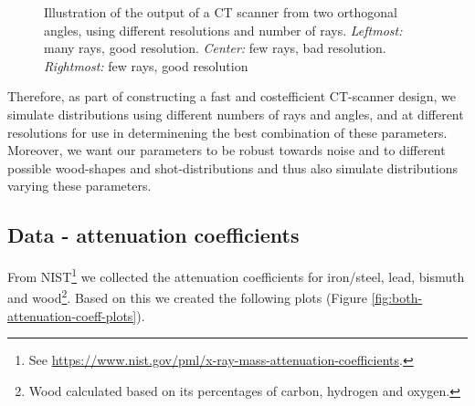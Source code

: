 \documentclass{article}
\begin{document}
\begin{figure}[htbp]
    \captionsetup{justification=centering}
    \caption[]{\small Illustration of the output of a CT scanner from two orthogonal angles, using different resolutions and number of rays. \emph{Leftmost:} many rays, good resolution. \emph{Center:} few rays, bad resolution. \emph{Rightmost:} few rays, good resolution}
    \label{fig:tikz-pictures}
\end{figure} 
Therefore, as part of constructing a fast and costefficient CT-scanner design, we simulate distributions using different numbers of rays and angles, and at different resolutions for use in determinening the best combination of these parameters. Moreover, we want our parameters to be robust towards noise and to different possible wood-shapes and shot-distributions and thus also simulate distributions varying these parameters.

\subsection{Data - attenuation coefficients}
From NIST\footnote{See \url{https://www.nist.gov/pml/x-ray-mass-attenuation-coefficients}.} we collected the attenuation coefficients for iron/steel, lead, bismuth and wood\footnote{Wood calculated based on its percentages of carbon, hydrogen and oxygen.}. Based on this we created the following plots (Figure \ref{fig:both-attenuation-coeff-plots}).
\end{document}
